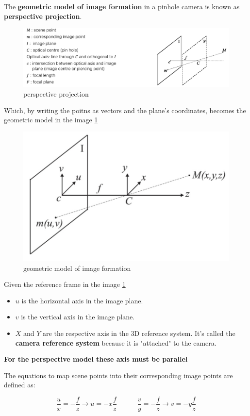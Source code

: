 The \textbf{geometric model of image formation} in a pinhole camera is known as \textbf{perspective projection}.

\begin{figure}[htbp]
  \centering
  \includegraphics[width=0.9\linewidth]{./img/perspective_projection.jpg}
  \caption{perspective projection}
\end{figure}

Which, by writing the poitns as vectors and the plane's coordinates, becomes the geometric model in the image \ref{fig:perspective_projection_axis}

\begin{figure}[htbp]
  \centering
  \includegraphics[width=0.45\linewidth]{./img/perspective_projection_axis.jpg}
  \caption{geometric model of image formation}
  \label{fig:perspective_projection_axis}
\end{figure}

Given the reference frame in the image \ref{fig:perspective_projection_axis} 
\begin{itemize}
  \item $u$ is the horizontal axis in the image plane.
  \item $v$ is the vertical axis in the image plane.
  \item $X$ and $Y$ are the respective axis in the 3D reference system. It's called the \textbf{camera reference system} because it is "attached" to the camera.
\end{itemize}

\textbf{For the perspective model these axis must be parallel}

The equations to map scene points into their corresponding image points are defined as:

$$\frac{u}{x} = -\frac{f}{z} \rightarrow u = -x\frac{f}{z} \quad\quad\quad \frac{v}{y} = - \frac{f}{z} \rightarrow v = -y\frac{f}{z}$$

